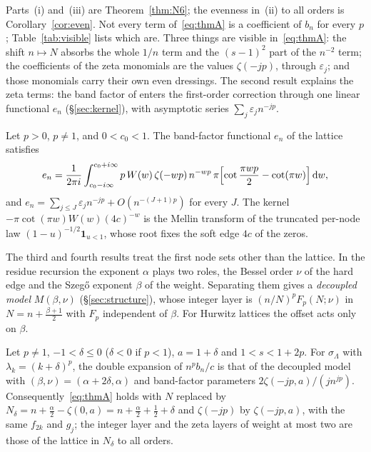 Parts~(i) and~(iii) are Theorem~\ref{thm:N6}; the evenness in~(ii) to all orders is Corollary~\ref{cor:even}. Not every term
of~\eqref{eq:thmA} is a coefficient of $b_n$ for every $p$; Table~\ref{tab:visible} lists which are. Three things are visible
in~\eqref{eq:thmA}: the shift $n\mapsto N$ absorbs the whole $1/n$ term and the $(s-1)^2$ part of the $n^{-2}$ term; the
coefficients of the zeta monomials are the values $\zeta(-jp)$, through $\varepsilon_j$; and those monomials carry their own
even dressings. The second result explains the zeta terms: the band factor of \cite{PaperII} enters the first-order
correction through one linear functional $e_n$ (\S\ref{sec:kernel}), with asymptotic series $\sum_j\varepsilon_jn^{-jp}$.

\begin{mainthm}\label{thm:B}
Let $p>0$, $p\ne1$, and $0<c_0<1$. The band-factor functional $e_n$ of the lattice satisfies
\[
  e_n=\frac1{2\pi i}\int_{c_0-i\infty}^{c_0+i\infty}p\,W(w)\,\zeta(-wp)\,n^{-wp}\,
  \pi\Bigl[\cot\frac{\pi wp}2-\cot(\pi w)\Bigr]\,\mathrm{d} w ,
\]
and $e_n=\sum_{j\le J}\varepsilon_jn^{-jp}+O(n^{-(J+1)p})$ for every $J$. The kernel $-\pi\cot(\pi w)W(w)(4c)^{-w}$ is the Mellin
transform of the truncated per-node law $(1-u)^{-1/2}\mathbf 1_{u<1}$, whose root fixes the soft edge $4c$ of the zeros.
\end{mainthm}

The third and fourth results treat the first node sets other than the lattice. In the residue recursion the exponent $\alpha$
plays two roles, the Bessel order $\nu$ of the hard edge and the Szeg\H{o} exponent $\beta$ of the weight. Separating them gives a
\emph{decoupled model} $M(\beta,\nu)$ (\S\ref{sec:structure}), whose integer layer is $(n/N)^pF_p(N;\nu)$ in $N=n+\frac{\beta+1}2$ with
$F_p$ independent of $\beta$. For Hurwitz lattices the offset acts only on $\beta$.

\begin{mainthm}\label{thm:C}
Let $p\ne1$, $-1<\delta\le0$ ($\delta<0$ if $p<1$), $a=1+\delta$ and $1<s<1+2p$. For $\sigma_\Lambda$ with $\lambda_k=(k+\delta)^p$, the
double expansion of $n^pb_n/c$ is that of the decoupled model with $(\beta,\nu)=(\alpha+2\delta,\alpha)$ and band-factor parameters
$2\zeta(-jp,a)/(jn^{jp})$. Consequently~\eqref{eq:thmA} holds with $N$ replaced by
$N_\delta=n+\frac\alpha2-\zeta(0,a)=n+\frac\alpha2+\frac12+\delta$ and $\zeta(-jp)$ by $\zeta(-jp,a)$, with the same $f_{2k}$ and $g_j$;
the integer layer and the zeta layers of weight at most two are those of the lattice in $N_\delta$ to all orders.
\end{mainthm}

